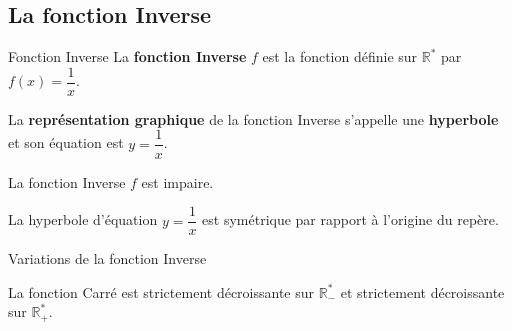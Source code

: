 
\begin{pageCours} %


\section{La fonction Inverse}



\begin{DefT}{Fonction Inverse}
La \textbf{fonction Inverse} $f$ est la fonction définie sur $\mathbb{R}^*$ par $f(x)=\dfrac{1}{x}$.
 
La \textbf{représentation graphique} de la fonction Inverse s'appelle une \textbf{hyperbole} et son équation est $y=\dfrac{1}{x}$. 
\end{DefT}

\begin{minipage}{0.48\linewidth}
\begin{Th} 
La fonction Inverse $f$ est impaire.

La hyperbole d'équation $y=\dfrac{1}{x}$ est symétrique par rapport à l'origine du repère.
\end{Th}


\begin{ThT}{Variations de la fonction Inverse}

La fonction Carré est strictement décroissante sur $\mathbb{R}^*_-$ et strictement décroissante sur $\mathbb{R}^*_+$. 


\end{ThT}

\end{minipage}
\hfill
\begin{minipage}{0.48\linewidth}


\end{minipage}
\end{pageCours}
